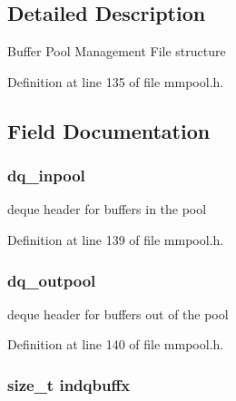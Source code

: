 \subsection{Detailed Description}
Buffer Pool Management File structure 

Definition at line 135 of file mmpool.\-h.



\subsection{Field Documentation}
\hypertarget{struct__bpmf__rec_a1df7df505d12e5d990076681f0f88f58}{
\subsubsection[{dq\-\_\-inpool}]{ dq\-\_\-inpool}}\label{struct__bpmf__rec_a1df7df505d12e5d990076681f0f88f58}


deque header for buffers in the pool 



Definition at line 139 of file mmpool.\-h.

\hypertarget{struct__bpmf__rec_adeae43b3e9243d22edc2ec8f16cb540f}{
\subsubsection[{dq\-\_\-outpool}]{ dq\-\_\-outpool}}\label{struct__bpmf__rec_adeae43b3e9243d22edc2ec8f16cb540f}


deque header for buffers out of the pool 



Definition at line 140 of file mmpool.\-h.

\hypertarget{struct__bpmf__rec_af137461fa262d2ab95ae8001687af33a}{
\subsubsection[{indqbuffx}]{\setlength{\rightskip}{0pt plus 5cm}size\-\_\-t indqbuffx}}\label{struct__bpmf__rec_af137461fa262d2ab95ae8001687af33a}



